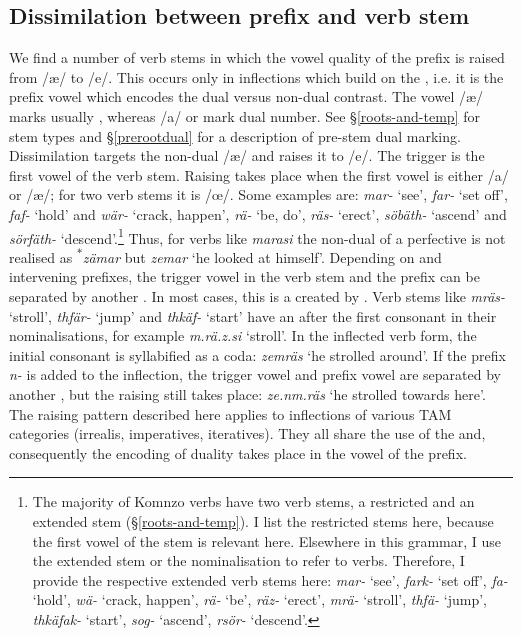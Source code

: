 \subsection{Dissimilation between prefix and verb stem} \label{vowelharmverbstem}

We find a number of verb stems in which the vowel quality of the prefix is raised from /æ/ to /e/. This occurs only in inflections which build on the , i.e. it is the prefix vowel which encodes the dual versus non-dual contrast. The vowel /æ/ marks usually , whereas /a/ or  mark dual number. See {\S}\ref{roots-and-temp} for stem types and {\S}\ref{prerootdual} for a description of pre-stem dual marking. Dissimilation targets the non-dual /æ/ and raises it to /e/. The trigger is the first vowel of the verb stem. Raising takes place when the first vowel is either /a/ or /æ/; for two verb stems it is /œ/. Some examples are: \emph{mar-} `see', \emph{far-} `set off', \emph{faf-} `hold' and \emph{wär-} `crack, happen', \emph{rä-} `be, do', \emph{räs-} `erect', \emph{söbäth-} `ascend' and \emph{sörfäth-} `descend'.\footnote{The majority of Komnzo verbs have two verb stems, a restricted and an extended stem (\S\ref{roots-and-temp}). I list the restricted stems here, because the first vowel of the stem is relevant here. Elsewhere in this grammar, I use the extended stem or the nominalisation to refer to verbs. Therefore, I provide the respective extended verb stems here: \emph{mar-} `see', \emph{fark-} `set off', \emph{fa-} `hold', \emph{wä-} `crack, happen', \emph{rä-} `be', \emph{räz-} `erect', \emph{mrä-} `stroll', \emph{thfä-} `jump', \emph{thkäfak-} `start', \emph{sog-} `ascend', \emph{rsör-} `descend'.} Thus, for verbs like \emph{marasi} the non-dual of a  perfective is not realised as \textsuperscript{$\ast$}\emph{zämar} but \emph{zemar} `he looked at himself'. Depending on  and intervening prefixes, the trigger vowel in the verb stem and the prefix can be separated by another . In most cases, this is a  created by . Verb stems like \emph{mräs-} `stroll', \emph{thfär-} `jump' and \emph{thkäf-} `start' have an  after the first consonant in their nominalisations, for example \emph{m.rä.z.si} `stroll'. In the inflected verb form, the initial consonant is syllabified as a coda: \emph{zemräs} `he strolled around'. If the  prefix \emph{n-} is added to the inflection, the trigger vowel and prefix vowel are separated by another , but the raising still takes place: \emph{ze.nm.räs} `he strolled towards here'. The raising pattern described here applies to inflections of various TAM categories (irrealis, imperatives, iteratives). They all share the use of the  and, consequently the encoding of duality takes place in the vowel of the prefix.

